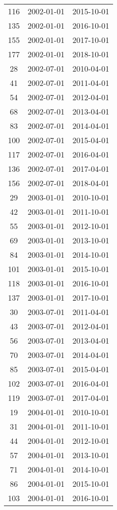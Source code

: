 \begin{tabular}{ccc}
  116 & 2002-01-01 & 2015-10-01 \\ 
  135 & 2002-01-01 & 2016-10-01 \\ 
  155 & 2002-01-01 & 2017-10-01 \\ 
  177 & 2002-01-01 & 2018-10-01 \\ 
  28 & 2002-07-01 & 2010-04-01 \\ 
  41 & 2002-07-01 & 2011-04-01 \\ 
  54 & 2002-07-01 & 2012-04-01 \\ 
  68 & 2002-07-01 & 2013-04-01 \\ 
  83 & 2002-07-01 & 2014-04-01 \\ 
  100 & 2002-07-01 & 2015-04-01 \\ 
  117 & 2002-07-01 & 2016-04-01 \\ 
  136 & 2002-07-01 & 2017-04-01 \\ 
  156 & 2002-07-01 & 2018-04-01 \\ 
  29 & 2003-01-01 & 2010-10-01 \\ 
  42 & 2003-01-01 & 2011-10-01 \\ 
  55 & 2003-01-01 & 2012-10-01 \\ 
  69 & 2003-01-01 & 2013-10-01 \\ 
  84 & 2003-01-01 & 2014-10-01 \\ 
  101 & 2003-01-01 & 2015-10-01 \\ 
  118 & 2003-01-01 & 2016-10-01 \\ 
  137 & 2003-01-01 & 2017-10-01 \\ 
  30 & 2003-07-01 & 2011-04-01 \\ 
  43 & 2003-07-01 & 2012-04-01 \\ 
  56 & 2003-07-01 & 2013-04-01 \\ 
  70 & 2003-07-01 & 2014-04-01 \\ 
  85 & 2003-07-01 & 2015-04-01 \\ 
  102 & 2003-07-01 & 2016-04-01 \\ 
  119 & 2003-07-01 & 2017-04-01 \\ 
  19 & 2004-01-01 & 2010-10-01 \\ 
  31 & 2004-01-01 & 2011-10-01 \\ 
  44 & 2004-01-01 & 2012-10-01 \\ 
  57 & 2004-01-01 & 2013-10-01 \\ 
  71 & 2004-01-01 & 2014-10-01 \\ 
  86 & 2004-01-01 & 2015-10-01 \\ 
  103 & 2004-01-01 & 2016-10-01 \\ 

\end{tabular}
